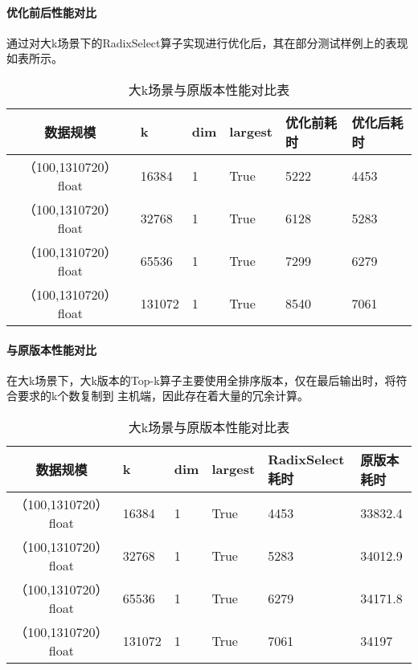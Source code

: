 \paragraph{优化前后性能对比}
通过对大k场景下的RadixSelect算子实现进行优化后，其在部分测试样例上的表现如表所示。
\begin{table}
    \centering
    \caption{大k场景与原版本性能对比表}
    \label{tab:bench_bigk_upgrade}
    \begin{tabular}{clllll}
        \toprule
        数据规模       &k  & dim  & largest & 优化前耗时    & 优化后耗时 \\
        \midrule
        （100,1310720） float&16384&  1     & True      & 5222 & 4453 \\
        （100,1310720） float&32768&  1     & True      & 6128 & 5283  \\
        （100,1310720） float&65536&  1     & True      & 7299 & 6279 \\
        （100,1310720） float&131072&  1     & True      & 8540 & 7061 \\
        \bottomrule
    \end{tabular}
    \end{table}



\paragraph{与原版本性能对比}
在大k场景下，大k版本的Top-k算子主要使用全排序版本，仅在最后输出时，将符合要求的k个数复制到
主机端，因此存在着大量的冗余计算。
\begin{table}
    \centering
    \caption{大k场景与原版本性能对比表}
    \label{tab:bench_bigk}
    \begin{tabular}{clllll}
        \toprule
        数据规模       &k  & dim  & largest & RadixSelect耗时    & 原版本耗时 \\
        \midrule
        （100,1310720） float&16384&  1     & True      & 4453 & 33832.4 \\
        （100,1310720） float&32768&  1     & True      & 5283 & 34012.9  \\
        （100,1310720） float&65536&  1     & True      & 6279 & 34171.8 \\
        （100,1310720） float&131072&  1     & True      & 7061 & 34197 \\
        
        \bottomrule
    \end{tabular}
    \end{table}



